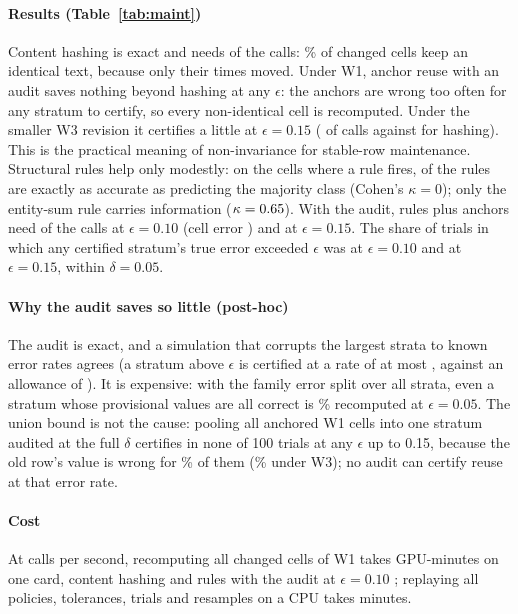 \documentclass[conference]{IEEEtran}
\begin{document}
\paragraph*{Results (Table~\ref{tab:maint})}
Content hashing is exact and needs \nEWonehashshare{} of the calls: \nEWonehashpct\% of changed cells keep an identical
text, because only their times moved. Under W1, anchor reuse with an audit saves nothing beyond hashing at any
$\epsilon$: the anchors are wrong too often for any stratum to certify, so every non-identical cell is recomputed.
Under the smaller W3 revision it certifies a little at $\epsilon=0.15$ (\nEWthreeanchorcertepsonefiveshare{} of calls
against \nEWthreehashshare{} for hashing). This is the practical meaning of non-invariance for stable-row maintenance. Structural rules help only modestly: on the \nEWonerulecells{} cells where a rule fires,
\nEWonerulesmajority{} of the \nEWonerulesn{} rules are exactly as accurate as predicting the majority class
(Cohen's $\kappa=0$); only the entity-sum rule carries information ($\kappa=0.65$). With the audit, rules plus
anchors need
\nEWoneechobaseepsonezeroshare{} of the calls at $\epsilon=0.10$ (cell error \nEWoneechobaseepsonezeroerr) and
\nEWoneechobaseepsonefiveshare{} at $\epsilon=0.15$. The share of trials in which any certified stratum's true error
exceeded $\epsilon$ was \nEWoneechobaseepsonezeroviol{} at $\epsilon=0.10$ and \nEWoneechobaseepsonefiveviol{} at
$\epsilon=0.15$, within $\delta=0.05$.
\paragraph*{Why the audit saves so little (post-hoc)} The audit is exact, and a simulation that corrupts the
\nPowerStrata{} largest strata to known error rates agrees (a stratum above $\epsilon$ is certified at a rate of at most
\nPowerViolMax, against an allowance of \nPowerAlpha). It is expensive: with the family error split over all strata,
even a stratum whose provisional values are all correct is \nPowerSampZero\% recomputed at $\epsilon=0.05$. The union
bound is not the cause: pooling all \nPoolWoneanchored{} anchored W1 cells into one stratum audited at the full $\delta$
certifies in none of 100 trials at any $\epsilon$ up to 0.15, because the old row's value is wrong for
\nPoolWoneanchorerr\% of them (\nPoolWthreeanchorerr\% under W3); no audit can certify reuse at that error rate.
\paragraph*{Cost} At \nThrBig{} calls per second, recomputing all changed cells of W1 takes \nMaintMinFull{}
GPU-minutes on one card, content hashing \nMaintMinHash{} and rules with the audit at $\epsilon=0.10$
\nMaintMinRules; replaying all policies, tolerances, trials and resamples on a CPU takes \nEWonewall{} minutes.
\end{document}
